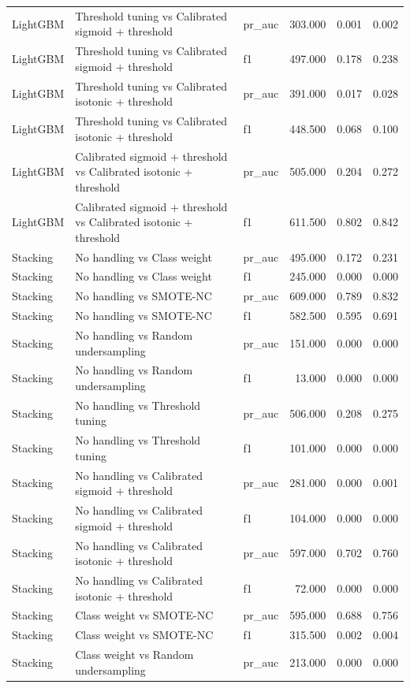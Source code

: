 \begin{tabular}{lllrrr}
LightGBM & Threshold tuning vs Calibrated sigmoid + threshold & pr_auc & 303.000 & 0.001 & 0.002 \\
LightGBM & Threshold tuning vs Calibrated sigmoid + threshold & f1 & 497.000 & 0.178 & 0.238 \\
LightGBM & Threshold tuning vs Calibrated isotonic + threshold & pr_auc & 391.000 & 0.017 & 0.028 \\
LightGBM & Threshold tuning vs Calibrated isotonic + threshold & f1 & 448.500 & 0.068 & 0.100 \\
LightGBM & Calibrated sigmoid + threshold vs Calibrated isotonic + threshold & pr_auc & 505.000 & 0.204 & 0.272 \\
LightGBM & Calibrated sigmoid + threshold vs Calibrated isotonic + threshold & f1 & 611.500 & 0.802 & 0.842 \\
Stacking & No handling vs Class weight & pr_auc & 495.000 & 0.172 & 0.231 \\
Stacking & No handling vs Class weight & f1 & 245.000 & 0.000 & 0.000 \\
Stacking & No handling vs SMOTE-NC & pr_auc & 609.000 & 0.789 & 0.832 \\
Stacking & No handling vs SMOTE-NC & f1 & 582.500 & 0.595 & 0.691 \\
Stacking & No handling vs Random undersampling & pr_auc & 151.000 & 0.000 & 0.000 \\
Stacking & No handling vs Random undersampling & f1 & 13.000 & 0.000 & 0.000 \\
Stacking & No handling vs Threshold tuning & pr_auc & 506.000 & 0.208 & 0.275 \\
Stacking & No handling vs Threshold tuning & f1 & 101.000 & 0.000 & 0.000 \\
Stacking & No handling vs Calibrated sigmoid + threshold & pr_auc & 281.000 & 0.000 & 0.001 \\
Stacking & No handling vs Calibrated sigmoid + threshold & f1 & 104.000 & 0.000 & 0.000 \\
Stacking & No handling vs Calibrated isotonic + threshold & pr_auc & 597.000 & 0.702 & 0.760 \\
Stacking & No handling vs Calibrated isotonic + threshold & f1 & 72.000 & 0.000 & 0.000 \\
Stacking & Class weight vs SMOTE-NC & pr_auc & 595.000 & 0.688 & 0.756 \\
Stacking & Class weight vs SMOTE-NC & f1 & 315.500 & 0.002 & 0.004 \\
Stacking & Class weight vs Random undersampling & pr_auc & 213.000 & 0.000 & 0.000 \\

\end{tabular}
